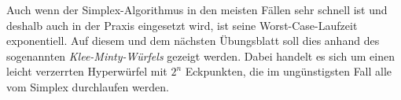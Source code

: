 \documentclass[11pt,german,a4paper,parskip=half-]{scrartcl}
\renewcommand{\u}[1]{\ensuremath{\underline{#1}}} %
\begin{document}
\begin{solution}
\begin{enumerate}
\begin{center}
\end{center}
\end{enumerate}
\end{solution}

\begin{exercise}{4}
Auch wenn der Simplex-Algorithmus in den meisten Fällen sehr schnell ist und deshalb auch in der Praxis eingesetzt wird, ist seine Worst-Case-Laufzeit exponentiell.
Auf diesem und dem nächsten Übungsblatt soll dies anhand des sogenannten \emph{Klee-Minty-Würfels} gezeigt werden. Dabei handelt es sich um einen leicht verzerrten
Hyperwürfel mit $2^n$ Eckpunkten, die im ungünstigsten Fall alle vom Simplex durchlaufen werden.


\end{exercise}
\end{document}
